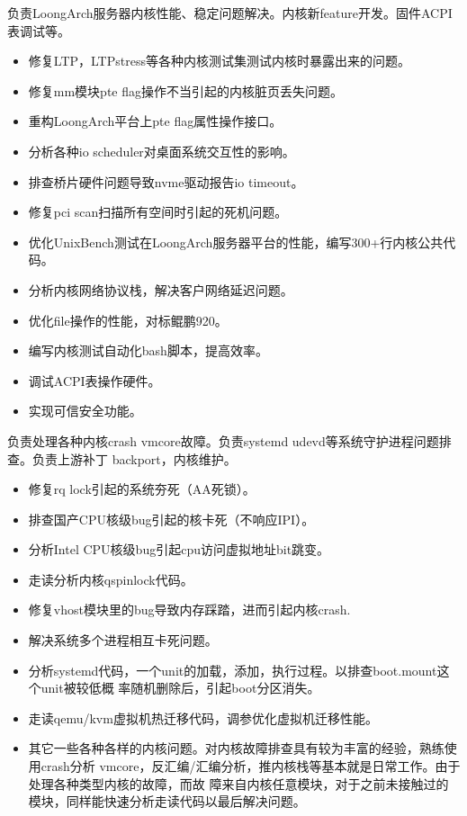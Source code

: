 \documentclass{resume}
\begin{document}
\begin{onehalfspacing}
负责LoongArch服务器内核性能、稳定问题解决。内核新feature开发。固件ACPI表调试等。
\begin{itemize}
  \item 修复LTP，LTPstress等各种内核测试集测试内核时暴露出来的问题。
  \item 修复mm模块pte flag操作不当引起的内核脏页丢失问题。
  \item 重构LoongArch平台上pte flag属性操作接口。
  \item 分析各种io scheduler对桌面系统交互性的影响。
  \item 排查桥片硬件问题导致nvme驱动报告io timeout。
  \item 修复pci scan扫描所有空间时引起的死机问题。
  \item 优化UnixBench测试在LoongArch服务器平台的性能，编写300+行内核公共代码。
  \item 分析内核网络协议栈，解决客户网络延迟问题。
  \item 优化file操作的性能，对标鲲鹏920。
  \item 编写内核测试自动化bash脚本，提高效率。
  \item 调试ACPI表操作硬件。
  \item 实现可信安全功能。
\end{itemize}
\end{onehalfspacing}

\begin{onehalfspacing}
  负责处理各种内核crash vmcore故障。负责systemd udevd等系统守护进程问题排查。负责上游补丁
  backport，内核维护。
  \begin{itemize}
  \item 修复rq lock引起的系统夯死（AA死锁）。
  \item 排查国产CPU核级bug引起的核卡死（不响应IPI）。
  \item 分析Intel CPU核级bug引起cpu访问虚拟地址bit跳变。
  \item 走读分析内核qspinlock代码。
  \item 修复vhost模块里的bug导致内存踩踏，进而引起内核crash.
  \item 解决系统多个进程相互卡死问题。
  \item 分析systemd代码，一个unit的加载，添加，执行过程。以排查boot.mount这个unit被较低概
    率随机删除后，引起boot分区消失。
  \item 走读qemu/kvm虚拟机热迁移代码，调参优化虚拟机迁移性能。
  \item 其它一些各种各样的内核问题。对内核故障排查具有较为丰富的经验，熟练使用crash分析
    vmcore，反汇编/汇编分析，推内核栈等基本就是日常工作。由于处理各种类型内核的故障，而故
    障来自内核任意模块，对于之前未接触过的模块，同样能快速分析走读代码以最后解决问题。
  \end{itemize}
\end{onehalfspacing}
\end{document}
